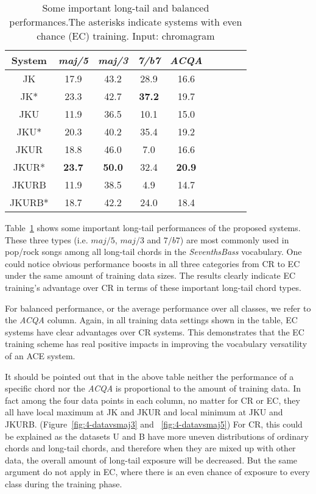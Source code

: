\begin{table}[htb]
	\caption{Some important long-tail and balanced performances.The asterisks indicate systems with even chance (EC) training. Input: chromagram}
	\label{tab:4-ltres}
	\centering
	\scriptsize
	\begin{tabular}{|c|c|c|c|c|c|c|c|c|}\hline
		System & \textit{maj/5} & \textit{maj/3} & \textit{7/b7} & \textit{ACQA}\\ \hline
		JK & 17.9 & 43.2 & 28.9 & 16.6\\ \hline
		JK* & 23.3 & 42.7 & \textbf{37.2} & 19.7\\ \hline
		JKU & 11.9 & 36.5 & 10.1 & 15.0\\ \hline
		JKU* & 20.3 & 40.2 & 35.4 & 19.2\\ \hline
		JKUR & 18.8 & 46.0 & 7.0 & 16.6\\ \hline
		JKUR* & \textbf{23.7} & \textbf{50.0} & 32.4 & \textbf{20.9}\\ \hline
		JKURB & 11.9 & 38.5 & 4.9 & 14.7\\ \hline
		JKURB* & 18.7 & 42.2 & 24.0 & 18.4\\ \hline
	\end{tabular}
\end{table}
Table~\ref{tab:4-ltres} shows some important long-tail performances of the proposed systems. These three types (i.e. $maj/5$, $maj/3$ and $7/b7$) are most commonly used in pop/rock songs among all long-tail chords in the \textit{SeventhsBass} vocabulary. One could notice obvious performance boosts in all three categories from CR to EC under the same amount of training data sizes. The results clearly indicate EC training's advantage over CR in terms of these important long-tail chord types.

For balanced performance, or the average performance over all classes, we refer to the \textit{ACQA} column. Again, in all training data settings shown in the table, EC systems have clear advantages over CR systems. This demonstrates that the EC training scheme has real positive impacts in improving the vocabulary versatility of an ACE system.

It should be pointed out that in the above table neither the performance of a specific chord nor the \textit{ACQA} is proportional to the amount of training data. In fact among the four data points in each column, no matter for CR or EC, they all have local maximum at JK and JKUR and local minimum at JKU and JKURB. (Figure~\ref{fig:4-datavsmaj3} and ~\ref{fig:4-datavsmaj5}) For CR, this could be explained as the datasets U and B have more uneven distributions of ordinary chords and long-tail chords, and therefore when they are mixed up with other data, the overall amount of long-tail exposure will be decreased. But the same argument do not apply in EC, where there is an even chance of exposure to every class during the training phase.

